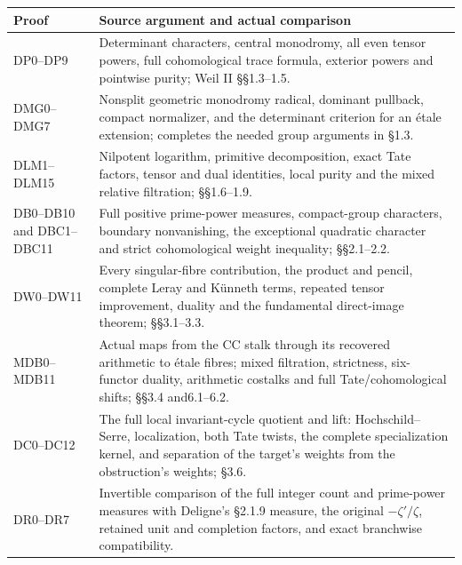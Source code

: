 \documentclass[
]{report}
\newcounter{none} %
\begin{document}
{\def\LTcaptype{none} %
\begin{longtable}[]{@{}
  >{\raggedright\arraybackslash}p{}
  >{\raggedright\arraybackslash}p{}@{}}
\toprule\noalign{}
\begin{minipage}[b]{\linewidth}\raggedright
Proof
\end{minipage} & \begin{minipage}[b]{\linewidth}\raggedright
Source argument and actual comparison
\end{minipage} \\
\midrule\noalign{}
\endhead
\bottomrule\noalign{}
\endlastfoot
DP0--DP9 & Determinant characters, central monodromy, all even tensor
powers, full cohomological trace formula, exterior powers and pointwise
purity; Weil II §§1.3--1.5. \\
DMG0--DMG7 & Nonsplit geometric monodromy radical, dominant pullback,
compact normalizer, and the determinant criterion for an étale
extension; completes the needed group arguments in §1.3. \\
DLM1--DLM15 & Nilpotent logarithm, primitive decomposition, exact Tate
factors, tensor and dual identities, local purity and the mixed relative
filtration; §§1.6--1.9. \\
DB0--DB10 and DBC1--DBC11 & Full positive prime-power measures,
compact-group characters, boundary nonvanishing, the exceptional
quadratic character and strict cohomological weight inequality;
§§2.1--2.2. \\
DW0--DW11 & Every singular-fibre contribution, the product and pencil,
complete Leray and Künneth terms, repeated tensor improvement, duality
and the fundamental direct-image theorem; §§3.1--3.3. \\
MDB0--MDB11 & Actual maps from the CC stalk through its recovered
arithmetic to étale fibres; mixed filtration, strictness, six-functor
duality, arithmetic costalks and full Tate/cohomological shifts; §§3.4
and6.1--6.2. \\
DC0--DC12 & The full local invariant-cycle quotient and lift:
Hochschild--Serre, localization, both Tate twists, the complete
specialization kernel, and separation of the target's weights from the
obstruction's weights; §3.6. \\
DR0--DR7 & Invertible comparison of the full integer count and
prime-power measures with Deligne's §2.1.9 measure, the original
\(-\zeta'/\zeta\), retained unit and completion factors, and exact
branchwise compatibility. \\
\end{longtable}
}
\end{document}
